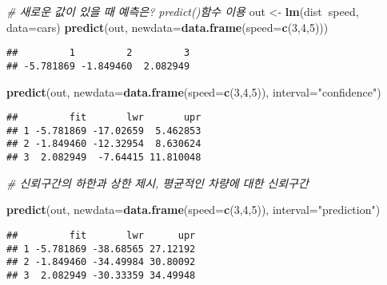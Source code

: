 \documentclass[]{article}
\newenvironment{Shaded}{\begin{snugshade}}{\end{snugshade}}
\newcommand{\KeywordTok}[1]{\textcolor[rgb]{0.13,0.29,0.53}{\textbf{#1}}}
\newcommand{\DataTypeTok}[1]{\textcolor[rgb]{0.13,0.29,0.53}{#1}}
\newcommand{\DecValTok}[1]{\textcolor[rgb]{0.00,0.00,0.81}{#1}}
\newcommand{\StringTok}[1]{\textcolor[rgb]{0.31,0.60,0.02}{#1}}
\newcommand{\CommentTok}[1]{\textcolor[rgb]{0.56,0.35,0.01}{\textit{#1}}}
\newcommand{\OperatorTok}[1]{\textcolor[rgb]{0.81,0.36,0.00}{\textbf{#1}}}
\newcommand{\NormalTok}[1]{#1}
\begin{document}
\begin{Shaded}
\begin{Highlighting}[]
\CommentTok{# 새로운 값이 있을 때 예측은? predict()함수 이용}
\NormalTok{out <-}\StringTok{ }\KeywordTok{lm}\NormalTok{(dist}\OperatorTok{~}\NormalTok{speed, }\DataTypeTok{data=}\NormalTok{cars)}
\KeywordTok{predict}\NormalTok{(out, }\DataTypeTok{newdata=}\KeywordTok{data.frame}\NormalTok{(}\DataTypeTok{speed=}\KeywordTok{c}\NormalTok{(}\DecValTok{3}\NormalTok{,}\DecValTok{4}\NormalTok{,}\DecValTok{5}\NormalTok{)))}
\end{Highlighting}
\end{Shaded}

\begin{verbatim}
##         1         2         3 
## -5.781869 -1.849460  2.082949
\end{verbatim}

\begin{Shaded}
\begin{Highlighting}[]
\KeywordTok{predict}\NormalTok{(out, }\DataTypeTok{newdata=}\KeywordTok{data.frame}\NormalTok{(}\DataTypeTok{speed=}\KeywordTok{c}\NormalTok{(}\DecValTok{3}\NormalTok{,}\DecValTok{4}\NormalTok{,}\DecValTok{5}\NormalTok{)), }\DataTypeTok{interval=}\StringTok{"confidence"}\NormalTok{) }
\end{Highlighting}
\end{Shaded}

\begin{verbatim}
##         fit       lwr       upr
## 1 -5.781869 -17.02659  5.462853
## 2 -1.849460 -12.32954  8.630624
## 3  2.082949  -7.64415 11.810048
\end{verbatim}

\begin{Shaded}
\begin{Highlighting}[]
\CommentTok{# 신뢰구간의 하한과 상한 제시, 평균적인 차량에 대한 신뢰구간}

\KeywordTok{predict}\NormalTok{(out, }\DataTypeTok{newdata=}\KeywordTok{data.frame}\NormalTok{(}\DataTypeTok{speed=}\KeywordTok{c}\NormalTok{(}\DecValTok{3}\NormalTok{,}\DecValTok{4}\NormalTok{,}\DecValTok{5}\NormalTok{)), }\DataTypeTok{interval=}\StringTok{"prediction"}\NormalTok{) }
\end{Highlighting}
\end{Shaded}

\begin{verbatim}
##         fit       lwr      upr
## 1 -5.781869 -38.68565 27.12192
## 2 -1.849460 -34.49984 30.80092
## 3  2.082949 -30.33359 34.49948
\end{verbatim}
\end{document}
